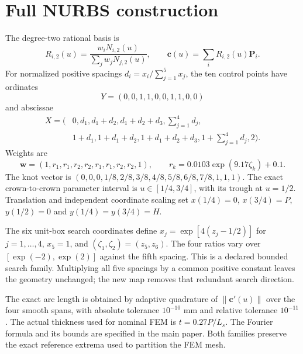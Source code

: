 \documentclass[11pt]{article}
\begin{document}
\section{Full NURBS construction}
The degree-two rational basis is
\begin{equation}
 R_{i,2}(u)=\frac{w_iN_{i,2}(u)}{\sum_j w_jN_{j,2}(u)},\qquad
 \mathbf c(u)=\sum_iR_{i,2}(u)\mathbf P_i.
\end{equation}
For normalized positive spacings $d_i=x_i/\sum_{j=1}^{5}x_j$, the ten control points have ordinates
\begin{equation}
 Y=(0,0,1,1,0,0,1,1,0,0)
\end{equation}
and abscissae
\begin{align}
 X=(&0,d_1,d_1+d_2,d_1+d_2+d_3,\sum_{j=1}^4d_j,\nonumber\\
 &1+d_1,1+d_1+d_2,1+d_1+d_2+d_3,1+\sum_{j=1}^4d_j,2).
\end{align}
Weights are
\begin{equation}
 \mathbf w=(1,r_1,r_1,r_2,r_2,r_1,r_1,r_2,r_2,1),\qquad
 r_k=0.0103\exp(9.17\zeta_k)+0.1.
\end{equation}
The knot vector is $(0,0,0,1/8,2/8,3/8,4/8,5/8,6/8,7/8,1,1,1)$. The exact crown-to-crown parameter interval is $u\in[1/4,3/4]$, with its trough at $u=1/2$. Translation and independent coordinate scaling set $x(1/4)=0$, $x(3/4)=P$, $y(1/2)=0$ and $y(1/4)=y(3/4)=H$.

The six unit-box search coordinates define $x_j=\exp[4(z_j-1/2)]$ for $j=1,\ldots,4$, $x_5=1$, and $(\zeta_1,\zeta_2)=(z_5,z_6)$. The four ratios vary over $[\exp(-2),\exp(2)]$ against the fifth spacing. This is a declared bounded search family. Multiplying all five spacings by a common positive constant leaves the geometry unchanged; the new map removes that redundant search direction.

The exact arc length is obtained by adaptive quadrature of $\|\mathbf c'(u)\|$ over the four smooth spans, with absolute tolerance $10^{-10}$ mm and relative tolerance $10^{-11}$. The actual thickness used for nominal FEM is $t=0.27P/L_s$. The Fourier formula and its bounds are specified in the main paper. Both families preserve the exact reference extrema used to partition the FEM mesh.
\end{document}
